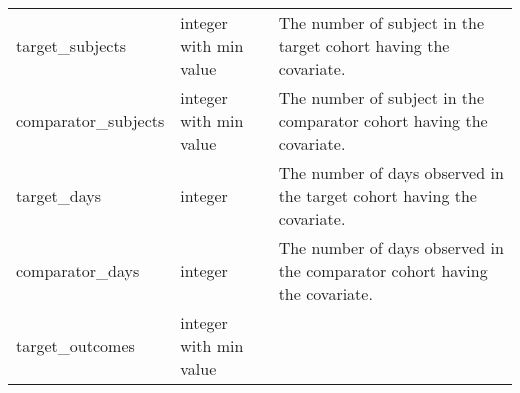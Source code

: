 \documentclass[
]{article}
\begin{document}
\begin{longtable}[]{@{}lll@{}}
\begin{minipage}[t]{0.23\columnwidth}
target\_subjects\strut
\end{minipage} & \begin{minipage}[t]{0.18\columnwidth}\raggedright
integer with min value\strut
\end{minipage} & \begin{minipage}[t]{0.50\columnwidth}\raggedright
The number of subject in the target cohort having the covariate.\strut
\end{minipage}\tabularnewline
\begin{minipage}[t]{0.23\columnwidth}\raggedright
comparator\_subjects\strut
\end{minipage} & \begin{minipage}[t]{0.18\columnwidth}\raggedright
integer with min value\strut
\end{minipage} & \begin{minipage}[t]{0.50\columnwidth}\raggedright
The number of subject in the comparator cohort having the
covariate.\strut
\end{minipage}\tabularnewline
\begin{minipage}[t]{0.23\columnwidth}\raggedright
target\_days\strut
\end{minipage} & \begin{minipage}[t]{0.18\columnwidth}\raggedright
integer\strut
\end{minipage} & \begin{minipage}[t]{0.50\columnwidth}\raggedright
The number of days observed in the target cohort having the
covariate.\strut
\end{minipage}\tabularnewline
\begin{minipage}[t]{0.23\columnwidth}\raggedright
comparator\_days\strut
\end{minipage} & \begin{minipage}[t]{0.18\columnwidth}\raggedright
integer\strut
\end{minipage} & \begin{minipage}[t]{0.50\columnwidth}\raggedright
The number of days observed in the comparator cohort having the
covariate.\strut
\end{minipage}\tabularnewline
\begin{minipage}[t]{0.23\columnwidth}\raggedright
target\_outcomes\strut
\end{minipage} & \begin{minipage}[t]{0.18\columnwidth}\raggedright
integer with min value\strut
\end{minipage} & \begin{minipage}[t]{0.50\columnwidth}\raggedright

\end{minipage}
\end{longtable}
\end{document}
